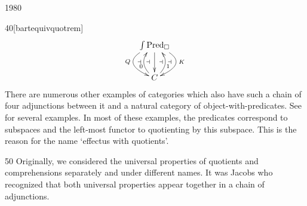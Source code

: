 \begin{parsec}{1980}
\begin{point}{40}[bartequivquotrem]
\begin{equation*}
   \vcenter{\xymatrix{
\int \Pred_\square \ar[d]_{\dashv\;}^{\;\dashv}
   \ar@/_6ex/[d]^{\;\dashv}_{Q} 
   \ar@/^6ex/[d]_{\dashv\;}^{K} \\
   C\ar@/^3ex/[u]^(0.4){0\!}\ar@/_3ex/[u]_(0.4){\!1}
}} 
\end{equation*}
There are numerous other examples
    of categories which also
    have such a chain of four adjunctions
    between it and a natural category of object-with-predicates.
    See \cite{cho2015quotient} for several examples.
    In most of these examples, the predicates correspond to subspaces
        and the left-most functor to quotienting by this subspace.
    This is the reason for the name `effectus with quotients'.
\begin{point}{50}%
Originally, we considered the universal properties of
    quotients and comprehensions separately and under different names.
It was Jacobs who recognized that both universal properties
    appear together in a chain of adjunctions.
\end{point}
\end{point}
\end{parsec}

